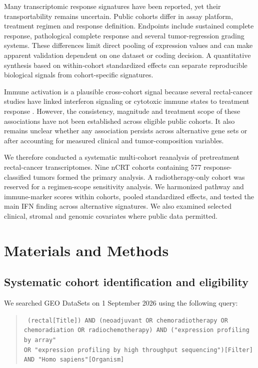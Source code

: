 \documentclass[11pt,a4paper]{article}
\begin{document}
Many transcriptomic response signatures have been reported, yet their transportability remains uncertain. Public cohorts differ in assay platform, treatment regimen and response definition. Endpoints include sustained complete response, pathological complete response and several tumor-regression grading systems. These differences limit direct pooling of expression values and can make apparent validation dependent on one dataset or coding decision. A quantitative synthesis based on within-cohort standardized effects can separate reproducible biological signals from cohort-specific signatures.

Immune activation is a plausible cross-cohort signal because several rectal-cancer studies have linked interferon signaling or cytotoxic immune states to treatment response \cite{Akiyoshi,Chatila,Alderdice}. However, the consistency, magnitude and treatment scope of these associations have not been established across eligible public cohorts. It also remains unclear whether any association persists across alternative gene sets or after accounting for measured clinical and tumor-composition variables.

We therefore conducted a systematic multi-cohort reanalysis of pretreatment rectal-cancer transcriptomes. Nine nCRT cohorts containing 577 response-classified tumors formed the primary analysis. A radiotherapy-only cohort was reserved for a regimen-scope sensitivity analysis. We harmonized pathway and immune-marker scores within cohorts, pooled standardized effects, and tested the main IFN finding across alternative signatures. We also examined selected clinical, stromal and genomic covariates where public data permitted.

\section{Materials and Methods}

\subsection{Systematic cohort identification and eligibility}

We searched GEO DataSets on 1 September 2026 using the following query:
\begin{quote}\small\texttt{%
(rectal[Title]) AND (neoadjuvant OR chemoradiotherapy OR \\
chemoradiation OR radiochemotherapy) AND ("expression profiling by array" \\
OR "expression profiling by high throughput sequencing")[Filter] \\
AND "Homo sapiens"[Organism]}\end{quote}
\end{document}
